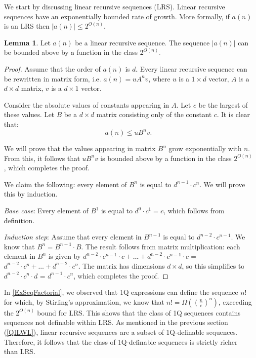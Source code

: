 \documentclass[en]{pracamgr}
\theoremstyle{definition}
\newtheorem{lemma}[theorem]{Lemma}
\begin{document}
We start by discussing linear recursive sequences (LRS). Linear recursive sequences have an exponentially bounded rate of growth. More formally, if $a(n)$ is an LRS then $|a(n)| \le 2^{O(n)}$.

\begin{lemma}
    Let $a(n)$ be a linear recursive sequence. The sequence $|a(n)|$ can be bounded above by a function in the class $2^{O(n)}$.
\end{lemma}

\begin{proof}
    Assume that the order of $a(n)$ is $d$. Every linear recursive sequence can be rewritten in matrix form, i.e. $a(n) = uA^nv$, where $u$ is a $1 \times d$ vector, $A$ is a $d \times d$ matrix, $v$ is a $d \times 1$ vector. 

    Consider the absolute values of constants appearing in $A$. Let $c$ be the largest of these values. Let $B$ be a $d \times d$ matrix consisting only of the constant $c$. It is clear that:
    $$a(n) \leq uB^nv.$$

    We will prove that the values appearing in matrix $B^n$ grow exponentially with $n$. From this, it follows that $uB^nv$ is bounded above by a function in the class $2^{O(n)}$, which completes the proof.

    We claim the following: every element of $B^n$ is equal to $d^{n-1} \cdot c^n$. We will prove this by induction.

    \emph{Base case}: Every element of $B^1$ is equal to $d^0 \cdot c^1 = c$, which follows from definition.

    \emph{Induction step}: Assume that every element in $B^{n-1}$ is equal to $d^{n-2} \cdot c^{n-1}$. We know that $B^n = B^{n-1} \cdot B$. The result follows from matrix multiplication: each element in $B^n$ is given by $d^{n-2} \cdot c^{n-1} \cdot c + \ldots + d^{n-2} \cdot c^{n-1} \cdot c$ = $d^{n-2} \cdot c^n + \ldots + d^{n-2} \cdot c^n$. The matrix has dimensions $d \times d$, so this simplifies to $d^{n-2} \cdot c^n \cdot d$ = $d^{n-1} \cdot c^n$, which completes the proof.
\end{proof}

In \cref{ExSeqFactorial}, we observed that 1Q expressions can define the sequence $n!$ for which, by Stirling's approximation, we know that $n! = \Omega((\frac{n}{e})^n)$, exceeding the $2^{O(n)}$ bound for LRS. This shows that the class of 1Q sequences contains sequences not definable within LRS. As mentioned in the previous section (\ref{QILWL}), linear recursive sequences are a subset of 1Q-definable sequences. Therefore, it follows that the class of 1Q-definable sequences is strictly richer than LRS.
\end{document}
